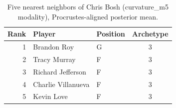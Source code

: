 \begin{table}[htbp]
  \centering\small
  \begin{tabular}{rllc}
    \toprule
    Rank & Player & Position & Archetype \\
    \midrule
    1 & Brandon Roy & G & 3 \\
    2 & Tracy Murray & F & 3 \\
    3 & Richard Jefferson & F & 3 \\
    4 & Charlie Villanueva & F & 3 \\
    5 & Kevin Love & F & 3 \\
    \bottomrule
  \end{tabular}
  \caption{Five nearest neighbors of Chris Bosh (curvature_m5 modality), Procrustes-aligned posterior mean.}
  \label{tab:Chris_Bosh_neighbors_curvature_m5}
\end{table}

